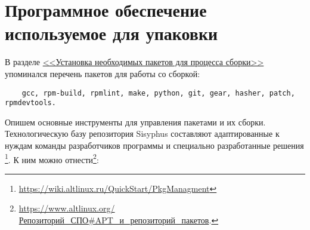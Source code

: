 \hypertarget{3}{\chapter{Программное обеспечение используемое для упаковки}}\label{software-used-for-packaging}

В разделе \hyperlink{1.3}{<<Установка необходимых пакетов для процесса сборки>>} 
упоминался перечень пакетов для работы со сборкой:
\begin{verbatim}
	gcc, rpm-build, rpmlint, make, python, git, gear, hasher, patch, rpmdevtools.
\end{verbatim}

Опишем основные инструменты для управления пакетами и их сборки. Технологическую 
базу репозитория Sisyphus составляют адаптированные к нуждам команды разработчиков 
программы и специально разработанные решения%
\footnote{\href{https://wiki.altlinux.ru/QuickStart/PkgManagment\#\%D0\%9E\%D1\%81\%D0\%BD\%D0\%BE\%D0\%B2\%D0\%BD\%D1\%8B\%D0\%B5_\%D0\%B8\%D0\%BD\%D1\%81\%D1\%82\%D1\%80\%D1\%83\%D0\%BC\%D0\%B5\%D0\%BD\%D1\%82\%D1\%8B_\%D0\%B4\%D0\%BB\%D1\%8F_\%D1\%83\%D0\%BF\%D1\%80\%D0\%B0\%D0\%B2\%D0\%BB\%D0\%B5\%D0\%BD\%D0\%B8\%D1\%8F_\%D0\%BF\%D0\%B0\%D0\%BA\%D0\%B5\%D1\%82\%D0\%B0\%D0\%BC\%D0\%B8}{https://wiki.altlinux.ru/QuickStart/PkgManagment}}. 
К ним можно отнести\footnote{\href{https://www.altlinux.org/\%D0\%A0\%D0\%B5\%D0\%BF\%D0\%BE\%D0\%B7\%D0\%B8\%D1\%82\%D0\%BE\%D1\%80\%D0\%B8\%D0\%B9_\%D0\%A1\%D0\%9F\%D0\%9E\#APT_\%D0\%B8_\%D1\%80\%D0\%B5\%D0\%BF\%D0\%BE\%D0\%B7\%D0\%B8\%D1\%82\%D0\%BE\%D1\%80\%D0\%B8\%D0\%B9_\%D0\%BF\%D0\%B0\%D0\%BA\%D0\%B5\%D1\%82\%D0\%BE\%D0\%B2}{https://www.altlinux.org/Репозиторий\_СПО\#APT\_и\_репозиторий\_пакетов}.}:
